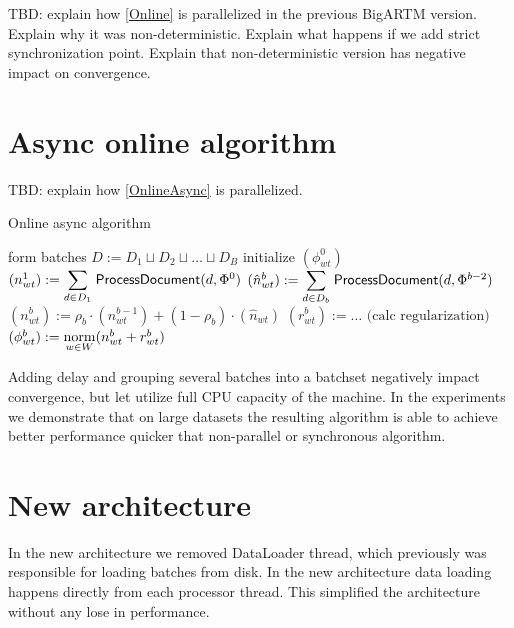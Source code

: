 \documentclass[russian,english]{llncs}
\newcommand{\norm}{\mathop{\rm norm}\limits}
\newcommand{\kw}[1]{\textsf{#1}}
\begin{document}
TBD: explain how \ref{Online} is parallelized in the previous BigARTM version.
Explain why it was non-deterministic.
Explain what happens if we add strict synchronization point.
Explain that non-deterministic version has negative impact on convergence.

\section{Async online algorithm}
\label{sec:Algorithm}

TBD: explain how \ref{OnlineAsync} is parallelized.

\SetAlgoSkip{}
\begin{algorithm2e}[h]
\caption{Online async algorithm} %
\label{alg:OnlineAsync}
\BlankLine
{}
\BlankLine
form batches $D := D_1 \sqcup D_2 \sqcup \dots \sqcup D_B$\;
initialize $(\phi^0_{wt})$\;
$(n^1_{wt}) := \mathlarger\sum\limits_{d \in D_1} \; \kw{ProcessDocument}(d, \Phi^0)$\;
 {
    $(\hat n^b_{wt}) := \mathlarger\sum\limits_{d \in D_b} \; \kw{ProcessDocument}(d, \Phi^{b-2})$\;
    $(n^b_{wt}) := \rho_b \cdot (n^{b-1}_{wt}) + (1 - \rho_b) \cdot (\hat n_{wt})$\;
    $(r^b_{wt}) := \dots \text{ (calc regularization)}$\;
    $(\phi^b_{wt}) := \norm_{w \in W} (n^b_{wt} + r^b_{wt})$\;
}
\end{algorithm2e}


Adding delay and grouping several batches into a batchset negatively impact convergence,
but let utilize full CPU capacity of the machine.
In the experiments we demonstrate that on large datasets the resulting algorithm
is able to achieve better performance quicker that non-parallel or synchronous algorithm.

\section{New architecture}
\label{sec:Architecture}

In the new architecture we removed DataLoader thread,
which previously was responsible for loading batches from disk.
In the new architecture data loading happens directly from each processor thread.
This simplified the architecture without any lose in performance.
\end{document}
